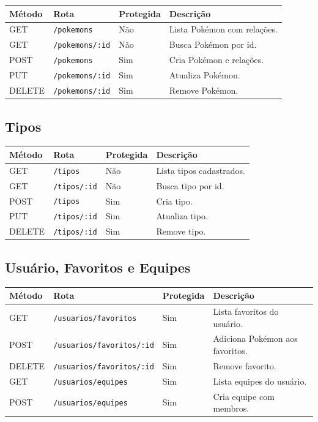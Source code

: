 \documentclass[12pt,a4paper]{article}
\begin{document}
\begin{table}[H]
\centering
\begin{tabular}{p{2cm}p{4.5cm}p{2cm}p{5cm}}
\toprule
\textbf{Método} & \textbf{Rota} & \textbf{Protegida} & \textbf{Descrição}\\
\midrule
GET & \texttt{/pokemons} & Não & Lista Pokémon com relações.\\
GET & \texttt{/pokemons/:id} & Não & Busca Pokémon por id.\\
POST & \texttt{/pokemons} & Sim & Cria Pokémon e relações.\\
PUT & \texttt{/pokemons/:id} & Sim & Atualiza Pokémon.\\
DELETE & \texttt{/pokemons/:id} & Sim & Remove Pokémon.\\
\bottomrule
\end{tabular}
\end{table}

\subsection{Tipos}

\begin{table}[H]
\centering
\begin{tabular}{p{2cm}p{4.5cm}p{2cm}p{5cm}}
\toprule
\textbf{Método} & \textbf{Rota} & \textbf{Protegida} & \textbf{Descrição}\\
\midrule
GET & \texttt{/tipos} & Não & Lista tipos cadastrados.\\
GET & \texttt{/tipos/:id} & Não & Busca tipo por id.\\
POST & \texttt{/tipos} & Sim & Cria tipo.\\
PUT & \texttt{/tipos/:id} & Sim & Atualiza tipo.\\
DELETE & \texttt{/tipos/:id} & Sim & Remove tipo.\\
\bottomrule
\end{tabular}
\end{table}

\subsection{Usuário, Favoritos e Equipes}

\begin{table}[H]
\centering
\begin{tabular}{p{2cm}p{4.8cm}p{2cm}p{4.7cm}}
\toprule
\textbf{Método} & \textbf{Rota} & \textbf{Protegida} & \textbf{Descrição}\\
\midrule
GET & \texttt{/usuarios/favoritos} & Sim & Lista favoritos do usuário.\\
POST & \texttt{/usuarios/favoritos/:id} & Sim & Adiciona Pokémon aos favoritos.\\
DELETE & \texttt{/usuarios/favoritos/:id} & Sim & Remove favorito.\\
GET & \texttt{/usuarios/equipes} & Sim & Lista equipes do usuário.\\
POST & \texttt{/usuarios/equipes} & Sim & Cria equipe com membros.\\
\bottomrule
\end{tabular}
\end{table}
\end{document}
